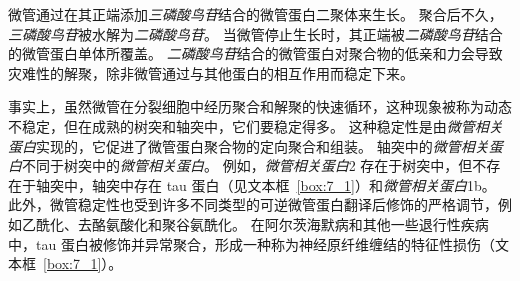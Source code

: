 微管通过在其正端添加\textit{三磷酸鸟苷}结合的微管蛋白二聚体来生长。
聚合后不久，\textit{三磷酸鸟苷}被水解为\textit{二磷酸鸟苷}。
当微管停止生长时，其正端被\textit{二磷酸鸟苷}结合的微管蛋白单体所覆盖。
\textit{二磷酸鸟苷}结合的微管蛋白对聚合物的低亲和力会导致灾难性的解聚，除非微管通过与其他蛋白的相互作用而稳定下来。


事实上，虽然微管在分裂细胞中经历聚合和解聚的快速循环，这种现象被称为动态不稳定，但在成熟的树突和轴突中，它们要稳定得多。
这种稳定性是由\textit{微管相关蛋白}实现的，它促进了微管蛋白聚合物的定向聚合和组装。
轴突中的\textit{微管相关蛋白}不同于树突中的\textit{微管相关蛋白}。
例如，\textit{微管相关蛋白}2 存在于树突中，但不存在于轴突中，轴突中存在 tau 蛋白（见文本框~\ref{box:7_1}）和\textit{微管相关蛋白}1b。
此外，微管稳定性也受到许多不同类型的可逆微管蛋白翻译后修饰的严格调节，例如乙酰化、去酪氨酸化和聚谷氨酰化。
在阿尔茨海默病和其他一些退行性疾病中，tau 蛋白被修饰并异常聚合，形成一种称为神经原纤维缠结的特征性损伤（文本框~\ref{box:7_1}）。


